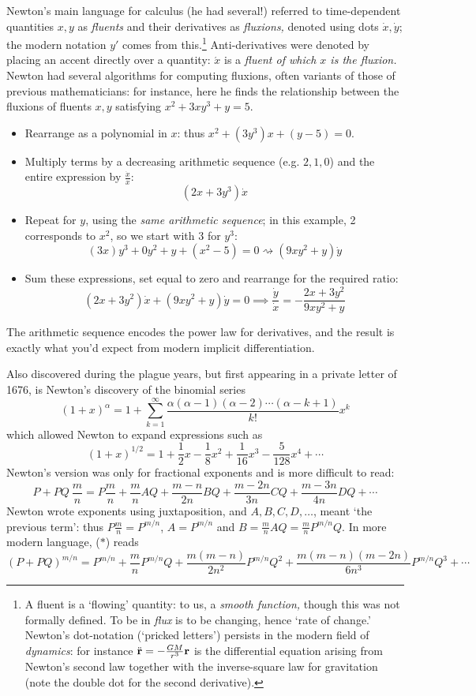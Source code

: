  Newton's main language for calculus (he had several!) referred to time-dependent quantities $x,y$ as \emph{fluents} and their derivatives as \emph{fluxions,} denoted using dots $\dot x,\dot y$; the modern notation $y'$ comes from this.\footnote{%
	A fluent is a `flowing' quantity: to us, a \emph{smooth function,} though this was not formally defined. To be in \emph{flux} is to be changing, hence `rate of change.' Newton's dot-notation (`pricked letters') persists in the modern field of \emph{dynamics}: for instance $\ddot{{\mathbf{r}}}=-\frac{GM}{r^3}{\mathbf{r}}$ is the differential equation arising from Newton's second law together with the inverse-square law for gravitation (note the double dot for the second derivative).
}
Anti-derivatives were denoted by placing an accent directly over a quantity: $\acute{x}$ is a \emph{fluent of which $x$ is the fluxion.} Newton had several algorithms for computing fluxions, often variants of those of previous mathematicians: for instance, here he finds the relationship between the fluxions of fluents $x,y$ satisfying $x^2+3xy^3+y=5$.
\begin{itemize}\itemsep0pt
  \item Rearrange as a polynomial in $x$: thus $x^2+(3y^3)x+(y-5)=0$.
  \item Multiply terms by a decreasing arithmetic sequence (e.g.{} $2,1,0$) and the entire expression by $\frac{\dot x}x$:
  \[
  	(2x+3y^3)\dot x
  \] 
  \item Repeat for $y$, using the \emph{same arithmetic sequence}; in this example, 2 corresponds to $x^2$, so we start with 3 for $y^3$:
  \[
  	(3x)y^3+0y^2+y+(x^2-5)=0\rightsquigarrow (9xy^2+y)\dot y
  \]
  \item Sum these expressions, set equal to zero and rearrange for the required ratio:
  \[
  	(2x+3y^2)\dot x+(9xy^2+y)\dot y=0 \implies \frac{\dot y}{\dot x} = -\frac{2x+3y^2}{9xy^2+y}
  \]
\end{itemize}
The arithmetic sequence encodes the power law for derivatives, and the result is exactly what you'd expect from modern implicit differentiation.



Also discovered during the plague years, but first appearing in a private letter of 1676, is Newton's discovery of the binomial series
\[
	(1+x)^\alpha=1+\sum_{k=1}^\infty\frac{\alpha(\alpha-1)(\alpha-2)\cdots(\alpha-k+1)}{k!}x^k
\]
which allowed Newton to expand expressions such as
\[
	(1+x)^{1/2} = 1+\frac 12x-\frac{1}{8}x^2 +\frac{1}{16}x^3 -\frac{5}{128}x^4 +\cdots
\]
Newton's version was only for fractional exponents and is more difficult to read:
\[
	P+PQ\ \frac mn=P\frac mn+\frac mnAQ+\frac{m-n}{2n}BQ+\frac{m-2n}{3n}CQ+\frac{m-3n}{4n}DQ+\cdots \tag{$\ast$}
\]
Newton wrote exponents using juxtaposition, and $A,B,C,D,\ldots$, meant `the previous term': thus $P\frac mn=P^{m/n}$, $A=P^{m/n}$ and $B=\frac mnAQ=\frac mnP^{m/n}Q$. In more modern language, ($\ast$) reads
\[
	(P+PQ)^{m/n}=P^{m/n}+\frac mn P^{m/n}Q +\frac{m(m-n)}{2n^2}P^{m/n}Q^2 +\frac{m(m-n)(m-2n)}{6n^3}P^{m/n}Q^3+\cdots
\]

